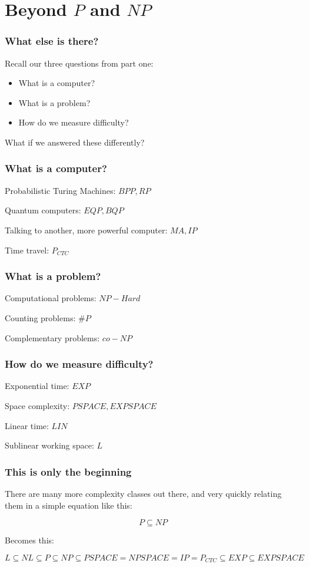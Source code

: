 \documentclass[aspectratio=169]{beamer}
\begin{document}
\section{Beyond $P$ and $NP$}

\begin{frame}
\frametitle{What else is there?}
Recall our three questions from part one:
\begin{itemize}
    \item What is a computer?
    \item What is a problem?
    \item How do we measure difficulty?
\end{itemize}
What if we answered these differently?
\end{frame}

\begin{frame}
\frametitle{What is a computer?}
Probabilistic Turing Machines: $BPP, RP$

Quantum computers:  $EQP, BQP$

Talking to another, more powerful computer: $MA, IP$

Time travel: $P_{CTC}$
\end{frame}

\begin{frame}
\frametitle{What is a problem?}
Computational problems: $NP-Hard$

Counting problems: $\#P$

Complementary problems: $co-NP$
\end{frame}

\begin{frame}
\frametitle{How do we measure difficulty?}
Exponential time: $EXP$

Space complexity: $PSPACE, EXPSPACE$

Linear time: $LIN$

Sublinear working space: $L$
\end{frame}

\begin{frame}
\frametitle{This is only the beginning}
There are many more complexity classes out there, and very quickly relating them in a simple equation like this:

$$P \subseteq NP$$

Becomes this:

$$L \subseteq NL \subseteq P \subseteq NP \subseteq PSPACE = NPSPACE = IP = P_{CTC} \subseteq EXP \subseteq EXPSPACE$$
\end{frame}
\end{document}
